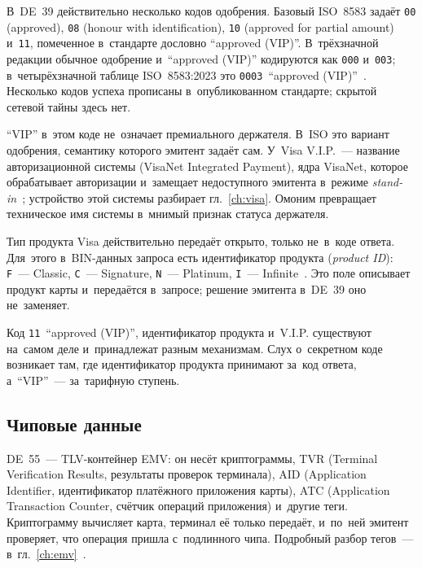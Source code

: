 В~DE~39 действительно несколько кодов одобрения. Базовый ISO~8583 задаёт
\texttt{00} (approved), \texttt{08} (honour with identification),
\texttt{10} (approved for partial amount) и~\texttt{11}, помеченное
в~стандарте дословно \enquote{approved (VIP)}. В~трёхзначной редакции обычное
одобрение и~\enquote{approved (VIP)} кодируются как \texttt{000}
и~\texttt{003}; в~четырёхзначной таблице ISO~8583:2023 это
\texttt{0003}~\enquote{approved (VIP)}~\cite{iso-8583-2023}. Несколько кодов
успеха прописаны в~опубликованном стандарте; скрытой сетевой тайны здесь нет.

\enquote{VIP} в~этом коде не~означает премиального держателя. В~ISO это
вариант одобрения, семантику которого эмитент задаёт сам. У~Visa V.I.P.~---
название авторизационной системы (VisaNet Integrated Payment), ядра VisaNet,
которое обрабатывает авторизации и~замещает недоступного эмитента в~режиме
\textit{stand-in}~\cite{visa-vip-system-overview-2005, visa-stip-2020};
устройство этой системы разбирает гл.~\ref{ch:visa}. Омоним превращает
техническое имя системы в~мнимый признак статуса держателя.

Тип продукта Visa действительно передаёт открыто, только не~в~коде ответа.
Для~этого в~BIN-данных запроса есть идентификатор продукта (\textit{product
ID}): \texttt{F}~--- Classic, \texttt{C}~--- Signature, \texttt{N}~---
Platinum, \texttt{I}~--- Infinite~\cite{visa-request-response-codes}. Это поле
описывает продукт карты и~передаётся в~запросе; решение эмитента в~DE~39 оно
не~заменяет.

Код \texttt{11}~\enquote{approved (VIP)}, идентификатор продукта и~V.I.P.
существуют на~самом деле и~принадлежат разным механизмам. Слух о~секретном
коде возникает там, где идентификатор продукта принимают за~код ответа,
а~\enquote{VIP}~--- за~тарифную ступень.

\subsection*{Чиповые данные}

DE~55~--- TLV-контейнер EMV: он несёт криптограммы, TVR (Terminal Verification
Results, результаты проверок терминала), AID (Application Identifier,
идентификатор платёжного приложения карты), ATC (Application Transaction
Counter, счётчик операций приложения) и~другие теги. Криптограмму вычисляет
карта, терминал её только передаёт, и~по~ней эмитент проверяет, что операция
пришла с~подлинного чипа.
Подробный разбор тегов~--- в~гл.~\ref{ch:emv}~\cite{emvco-specs}.

